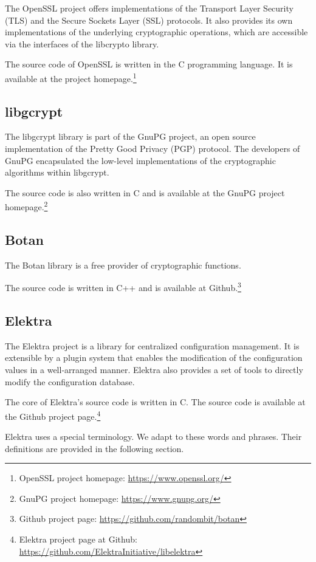 The OpenSSL project offers implementations of the Transport Layer Security (TLS) and the Secure Sockets Layer (SSL) protocols.
It also provides its own implementations of the underlying cryptographic operations, which are accessible via the interfaces of the libcrypto library.

The source code of OpenSSL is written in the C programming language.
It is available at the project homepage.\footnote{OpenSSL project homepage: \url{https://www.openssl.org/}}

	\subsection{libgcrypt}

The libgcrypt library is part of the GnuPG project, an open source implementation of the Pretty Good Privacy (PGP) protocol.
The developers of GnuPG encapsulated the low-level implementations of the cryptographic algorithms within libgcrypt.

The source code is also written in C and is available at the GnuPG project homepage.\footnote{GnuPG project homepage: \url{https://www.gnupg.org/}}

	\subsection{Botan}

The Botan library is a free provider of cryptographic functions.

The source code is written in C++ and is available at Github.\footnote{Github project page: \url{https://github.com/randombit/botan}}

	\subsection{Elektra}

The Elektra project is a library for centralized configuration management.
It is extensible by a plugin system that enables the modification of the configuration values in a well-arranged manner.
Elektra also provides a set of tools to directly modify the configuration database.

The core of Elektra's source code is written in C.
The source code is available at the Github project page.\footnote{Elektra project page at Github: \url{https://github.com/ElektraInitiative/libelektra}}

Elektra uses a special terminology.
We adapt to these words and phrases.
Their definitions are provided in the following section.

